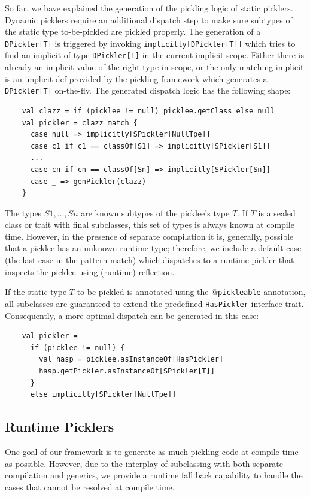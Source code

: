 \documentclass[10pt]{sigplanconf}
\theoremstyle{definition}
\theoremstyle{definition}
\newcommand{\term}[1]{\mbox{\texttt{#1}}}
\begin{document}
So far, we have explained the generation of the pickling logic of static
picklers. Dynamic picklers require an additional dispatch step to make sure
subtypes of the static type to-be-pickled are pickled properly. The generation
of a \term{DPickler[T]} is triggered by invoking
\verb|implicitly[DPickler[T]]| which tries to find an implicit of type
\term{DPickler[T]} in the current implicit scope. Either there is already an
implicit value of the right type in scope, or the only matching implicit is an
implicit def provided by the pickling framework which generates a
\term{DPickler[T]} on-the-fly. The generated dispatch logic has the following
shape:

\begin{lstlisting}
    val clazz = if (picklee != null) picklee.getClass else null
    val pickler = clazz match {
      case null => implicitly[SPickler[NullTpe]]
      case c1 if c1 == classOf[S1] => implicitly[SPickler[S1]]
      ...
      case cn if cn == classOf[Sn] => implicitly[SPickler[Sn]]
      case _ => genPickler(clazz)
    }
\end{lstlisting}

The types $S1, \dots, Sn$ are known subtypes of the picklee's type $T$. If $T$
is a sealed class or trait with final subclasses, this set of types is always
known at compile time. However, in the presence of separate compilation it is,
generally, possible that a picklee has an unknown runtime type; therefore, we
include a default case (the last case in the pattern match) which dispatches
to a runtime pickler that inspects the picklee using (runtime) reflection.

If the static type $T$ to be pickled is annotated using the
\term{$@$pickleable} annotation, all subclasses are guaranteed to extend the
predefined \verb|HasPickler| interface trait. Consequently, a more optimal
dispatch can be generated in this case:

\begin{lstlisting}
    val pickler =
      if (picklee != null) {
        val hasp = picklee.asInstanceOf[HasPickler]
        hasp.getPickler.asInstanceOf[SPickler[T]]
      }
      else implicitly[SPickler[NullTpe]]
\end{lstlisting}

\subsection{Runtime Picklers}
\label{sec:runtime-pickler}

One goal of our framework is to generate as much pickling code at compile time
as possible. However, due to the interplay of subclassing with both separate
compilation and generics, we provide a runtime fall back capability to handle
the cases that cannot be resolved at compile time.
\end{document}
